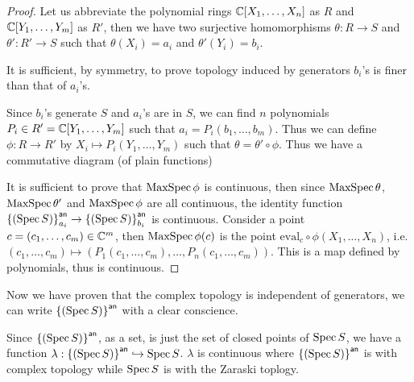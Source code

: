 \begin{proof}
  Let us abbreviate the polynomial rings $\mathbb{C}[X_{1},\dots, X_{n}]$ as $R$ and $\mathbb{C}[Y_{1},\dots, Y_{m}]$ as $R'$, then we have two surjective homomorphisms $\theta: R \to S$ and $\theta' : R' \to S$ such that $\theta(X_{i}) = a_{i}$ and $\theta'(Y_{i})=b_{i}$.

  It is sufficient, by symmetry, to prove topology induced by generators $b_{i}$'s is finer than that of $a_{i}$'s.

  Since $b_{i}$'s generate $S$ and $a_{i}$'s are in $S$, we can find $n$ polynomials $P_{i} \in R' = \mathbb{C}[Y_{1},\dots, Y_{m}]$ such that $a_{i} = P_{i}(b_{1},\dots, b_{m})$. Thus we can define $\phi : R \to R'$ by $X_{i}\mapsto P_{i}(Y_{1},\dots, Y_{m})$ such that $\theta = \theta' \circ \phi$. Thus we have a commutative diagram (of plain functions)
  \begin{center}
  \end{center}

  It is sufficient to prove that $\operatorname{MaxSpec} \phi$ is continuous, then since $\operatorname{MaxSpec} \theta$, $\operatorname{MaxSpec} \theta'$ and $\operatorname{MaxSpec} \phi$ are all continuous, the identity function ${\left\{{\left(\operatorname{Spec} S\right)}\right\}}^{\mathsf{an}}_{a_{i}} \to {\left\{{\left(\ensuremath{\operatorname{Spec}}S\right)}\right\}}^{\mathsf{an}}_{b_{i}}$ is continuous.
  Consider a point $c = (c_{1},\dots, c_{m}) \in \mathbb{C}^{m}$, then $\operatorname{MaxSpec}\phi(c)$ is the point $\mathrm{eval}_{c} \circ \phi (X_{1},\dots, X_{n})$, i.e. $(c_{1},\dots, c_{m}) \mapsto (P_{1}(c_{1},\dots,c_{m}),\dots, P_{n}(c_{1},\dots,c_{m}))$. This is a map defined by polynomials, thus is continuous.
\end{proof}

Now we have proven that the complex topology is independent of generators, we can write ${\left\{{\left(\operatorname{Spec} S\right)}\right\}}^{\mathsf{an}}$ with a clear conscience.

\begin{lemma} Since ${\left\{{\left(\operatorname{Spec} S\right)}\right\}}^{\mathsf{an}}$, as a set, is just the set of closed points of $\operatorname{Spec} S$, we have a function $\lambda: {\left\{{\left(\operatorname{Spec} S\right)}\right\}}^{\mathsf{an}} \hookrightarrow \operatorname{Spec} S$. $\lambda$ is continuous where ${\left\{{\left(\operatorname{Spec} S\right)}\right\}}^{\mathsf{an}}$ is with complex topology while $\operatorname{Spec} S$ is with the Zaraski toplogy.\label{thm:continuous-inclusion-complex-topology-affine}
\end{lemma}

